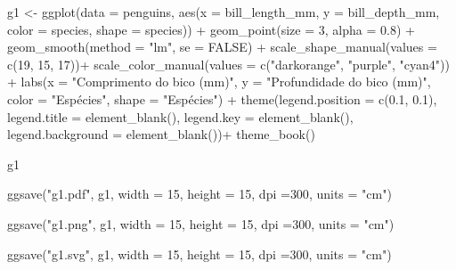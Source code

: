 \documentclass[
]{book}
\newenvironment{Shaded}{\begin{snugshade}}{\end{snugshade}}
\newcommand{\AttributeTok}[1]{\textcolor[rgb]{0.61,0.61,0.61}{#1}}
\newcommand{\ConstantTok}[1]{\textcolor[rgb]{0,0,0}{#1}}
\newcommand{\DecValTok}[1]{\textcolor[rgb]{0.06,0.06,0.06}{#1}}
\newcommand{\FloatTok}[1]{\textcolor[rgb]{0.06,0.06,0.06}{#1}}
\newcommand{\FunctionTok}[1]{\textcolor[rgb]{0,0,0}{#1}}
\newcommand{\NormalTok}[1]{#1}
\newcommand{\OtherTok}[1]{\textcolor[rgb]{0.37,0.37,0.37}{#1}}
\newcommand{\SpecialCharTok}[1]{\textcolor[rgb]{0,0,0}{#1}}
\newcommand{\StringTok}[1]{\textcolor[rgb]{0.5,0.5,0.5}{#1}}
\begin{document}
\begin{Shaded}
\begin{Highlighting}[]

\NormalTok{g1 }\OtherTok{\textless{}{-}} \FunctionTok{ggplot}\NormalTok{(}\AttributeTok{data =}\NormalTok{ penguins, }
       \FunctionTok{aes}\NormalTok{(}\AttributeTok{x =}\NormalTok{ bill\_length\_mm, }
           \AttributeTok{y =}\NormalTok{ bill\_depth\_mm,}
           \AttributeTok{color =}\NormalTok{ species,}
           \AttributeTok{shape =}\NormalTok{ species)) }\SpecialCharTok{+}
  \FunctionTok{geom\_point}\NormalTok{(}\AttributeTok{size =} \DecValTok{3}\NormalTok{, }
             \AttributeTok{alpha =} \FloatTok{0.8}\NormalTok{) }\SpecialCharTok{+}
  \FunctionTok{geom\_smooth}\NormalTok{(}\AttributeTok{method =} \StringTok{"lm"}\NormalTok{, }\AttributeTok{se =} \ConstantTok{FALSE}\NormalTok{) }\SpecialCharTok{+}
  \FunctionTok{scale\_shape\_manual}\NormalTok{(}\AttributeTok{values =} \FunctionTok{c}\NormalTok{(}\DecValTok{19}\NormalTok{, }\DecValTok{15}\NormalTok{, }\DecValTok{17}\NormalTok{))}\SpecialCharTok{+}
  \FunctionTok{scale\_color\_manual}\NormalTok{(}\AttributeTok{values =} \FunctionTok{c}\NormalTok{(}\StringTok{"darkorange"}\NormalTok{, }\StringTok{"purple"}\NormalTok{, }\StringTok{"cyan4"}\NormalTok{)) }\SpecialCharTok{+}
  \FunctionTok{labs}\NormalTok{(}\AttributeTok{x =} \StringTok{"Comprimento do bico (mm)"}\NormalTok{, }\AttributeTok{y =} \StringTok{"Profundidade do bico (mm)"}\NormalTok{, }
       \AttributeTok{color =} \StringTok{"Espécies"}\NormalTok{, }\AttributeTok{shape =} \StringTok{"Espécies"}\NormalTok{) }\SpecialCharTok{+}
  \FunctionTok{theme}\NormalTok{(}\AttributeTok{legend.position =} \FunctionTok{c}\NormalTok{(}\FloatTok{0.1}\NormalTok{, }\FloatTok{0.1}\NormalTok{),}
        \AttributeTok{legend.title =} \FunctionTok{element\_blank}\NormalTok{(),}
        \AttributeTok{legend.key =}  \FunctionTok{element\_blank}\NormalTok{(),}
        \AttributeTok{legend.background =} \FunctionTok{element\_blank}\NormalTok{())}\SpecialCharTok{+}
  \FunctionTok{theme\_book}\NormalTok{()}

\NormalTok{g1}

\FunctionTok{ggsave}\NormalTok{(}\StringTok{"g1.pdf"}\NormalTok{, g1, }
       \AttributeTok{width =} \DecValTok{15}\NormalTok{, }
       \AttributeTok{height =} \DecValTok{15}\NormalTok{, }
       \AttributeTok{dpi =}\DecValTok{300}\NormalTok{,}
       \AttributeTok{units =} \StringTok{"cm"}\NormalTok{)}

\FunctionTok{ggsave}\NormalTok{(}\StringTok{"g1.png"}\NormalTok{, g1, }
       \AttributeTok{width =} \DecValTok{15}\NormalTok{, }
       \AttributeTok{height =} \DecValTok{15}\NormalTok{, }
       \AttributeTok{dpi =}\DecValTok{300}\NormalTok{,}
       \AttributeTok{units =} \StringTok{"cm"}\NormalTok{)}

\FunctionTok{ggsave}\NormalTok{(}\StringTok{"g1.svg"}\NormalTok{, g1, }
       \AttributeTok{width =} \DecValTok{15}\NormalTok{, }
       \AttributeTok{height =} \DecValTok{15}\NormalTok{, }
       \AttributeTok{dpi =}\DecValTok{300}\NormalTok{,}
       \AttributeTok{units =} \StringTok{"cm"}\NormalTok{)}
\end{Highlighting}
\end{Shaded}
\end{document}
